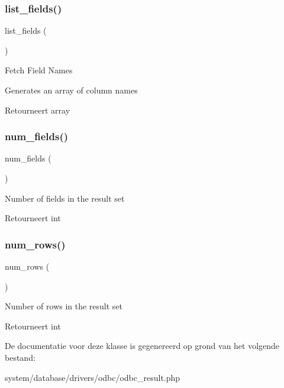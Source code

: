 \subsubsection{\texorpdfstring{list\_fields()}{list\_fields()}}
{\footnotesize\ttfamily list\+\_\+fields (\begin{DoxyParamCaption}{ }\end{DoxyParamCaption})}

Fetch Field Names

Generates an array of column names

\begin{DoxyReturn}{Retourneert}
array 
\end{DoxyReturn}
\mbox{\label{class_c_i___d_b__odbc__result_af831bf363e4d7d661a717a4932af449d}} 
\subsubsection{\texorpdfstring{num\_fields()}{num\_fields()}}
{\footnotesize\ttfamily num\+\_\+fields (\begin{DoxyParamCaption}{ }\end{DoxyParamCaption})}

Number of fields in the result set

\begin{DoxyReturn}{Retourneert}
int 
\end{DoxyReturn}
\mbox{\label{class_c_i___d_b__odbc__result_a218657c303ee499b97710ab0cd2f5d6e}} 
\subsubsection{\texorpdfstring{num\_rows()}{num\_rows()}}
{\footnotesize\ttfamily num\+\_\+rows (\begin{DoxyParamCaption}{ }\end{DoxyParamCaption})}

Number of rows in the result set

\begin{DoxyReturn}{Retourneert}
int 
\end{DoxyReturn}


De documentatie voor deze klasse is gegenereerd op grond van het volgende bestand\+:\begin{DoxyCompactItemize}
\item 
system/database/drivers/odbc/odbc\+\_\+result.\+php\end{DoxyCompactItemize}
